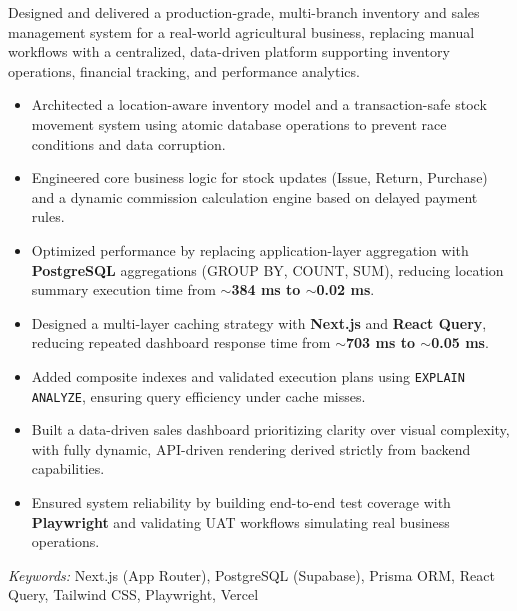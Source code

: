 \noindent
{}

\noindent
Designed and delivered a production-grade, multi-branch inventory and sales management system for a real-world agricultural business, replacing manual workflows with a centralized, data-driven platform supporting inventory operations, financial tracking, and performance analytics.

\begin{itemize}
    \item Architected a location-aware inventory model and a transaction-safe stock movement system using atomic database operations to prevent race conditions and data corruption.
    \item Engineered core business logic for stock updates (Issue, Return, Purchase) and a dynamic commission calculation engine based on delayed payment rules.
    \item Optimized performance by replacing application-layer aggregation with \textbf{PostgreSQL} aggregations (GROUP BY, COUNT, SUM), reducing location summary execution time from \textbf{$\sim$384 ms to $\sim$0.02 ms}.
    \item Designed a multi-layer caching strategy with \textbf{Next.js} and \textbf{React Query}, reducing repeated dashboard response time from \textbf{$\sim$703 ms to $\sim$0.05 ms}.
    \item Added composite indexes and validated execution plans using \texttt{EXPLAIN ANALYZE}, ensuring query efficiency under cache misses.
    \item Built a data-driven sales dashboard prioritizing clarity over visual complexity, with fully dynamic, API-driven rendering derived strictly from backend capabilities.
    \item Ensured system reliability by building end-to-end test coverage with \textbf{Playwright} and validating UAT workflows simulating real business operations.
\end{itemize}

\noindent
\textit{Keywords:} Next.js (App Router), PostgreSQL (Supabase), Prisma ORM, React Query, Tailwind CSS, Playwright, Vercel

